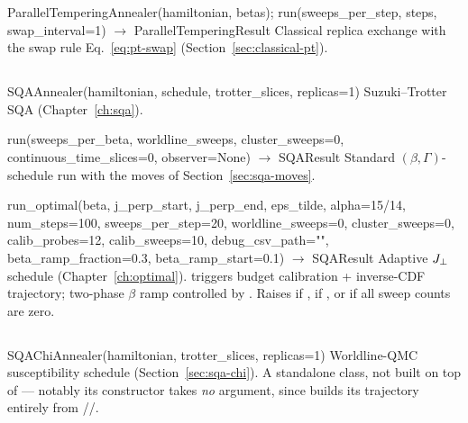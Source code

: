 \begin{apibox}{ParallelTemperingAnnealer(hamiltonian, betas);\;\;
run(sweeps\_per\_step, steps, swap\_interval=1) $\rightarrow$
ParallelTemperingResult}
Classical replica exchange with the swap rule Eq.~\eqref{eq:pt-swap}
(Section~\ref{sec:classical-pt}).
\end{apibox}

\subsection{}

\begin{apibox}{SQAAnnealer(hamiltonian, schedule, trotter\_slices,
replicas=1)}
Suzuki--Trotter SQA (Chapter~\ref{ch:sqa}).
\end{apibox}

\begin{apibox}{run(sweeps\_per\_beta, worldline\_sweeps, cluster\_sweeps=0,
continuous\_time\_slices=0, observer=None) $\rightarrow$ SQAResult}
Standard $(\beta,\Gamma)$-schedule run with the moves of
Section~\ref{sec:sqa-moves}.
\end{apibox}

\begin{apibox}{run\_optimal(beta, j\_perp\_start, j\_perp\_end, eps\_tilde,
alpha=15/14, num\_steps=100, sweeps\_per\_step=20, worldline\_sweeps=0,
cluster\_sweeps=0, calib\_probes=12, calib\_sweeps=10, debug\_csv\_path="",
beta\_ramp\_fraction=0.3, beta\_ramp\_start=0.1) $\rightarrow$ SQAResult}
Adaptive $J_{\perp}$ schedule (Chapter~\ref{ch:optimal}).
 triggers budget calibration + inverse-CDF trajectory;
two-phase $\beta$ ramp controlled by .
Raises  if , if
, or if all sweep counts are zero.
\end{apibox}

\subsection{}

\begin{apibox}{SQAChiAnnealer(hamiltonian, trotter\_slices, replicas=1)}
Worldline-QMC susceptibility schedule (Section~\ref{sec:sqa-chi}). A
standalone class, not built on top of  --- notably its
constructor takes \emph{no}  argument, since
 builds its trajectory entirely from
//.
\end{apibox}

